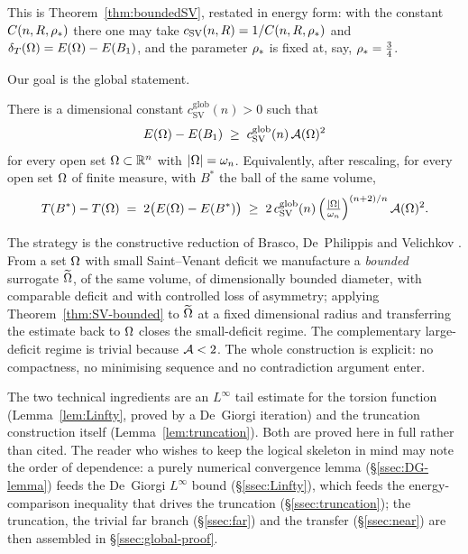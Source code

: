 This is Theorem~\ref{thm:boundedSV}, restated in energy form: with the
constant $C(n,R,\rho_*)$ there one may take
$c_{\mathrm{SV}}(n,R)=1/C(n,R,\rho_*)$ and
$\delta_T(\Omega)=E(\Omega)-E(B_1)$, and the parameter $\rho_*$ is fixed at, say,
$\rho_*=\tfrac34$.

Our goal is the global statement.

\begin{theorem}\label{thm:SV-global}
There is a dimensional constant $c_{\mathrm{SV}}^{\mathrm{glob}}(n)>0$
such that
\begin{equation}\label{eq:SV-global}
   E(\Omega)-E(B_1)\;\ge\;c_{\mathrm{SV}}^{\mathrm{glob}}(n)\,\mathcal A(\Omega)^2
\end{equation}
for every open set $\Omega\subset\mathbb R^n$ with $\left|\Omega\right|=\omega_n$.
Equivalently, after rescaling, for every open set $\Omega$ of finite
measure, with $B^*$ the ball of the same volume,
\begin{equation}\label{eq:T-global}
   T(B^*)-T(\Omega)\;=\;2\bigl(E(\Omega)-E(B^*)\bigr)\;\ge\;
   2\,c_{\mathrm{SV}}^{\mathrm{glob}}(n)\,
   \Bigl(\tfrac{\left|\Omega\right|}{\omega_n}\Bigr)^{(n+2)/n}\,\mathcal A(\Omega)^2 .
\end{equation}
\end{theorem}

The strategy is the constructive reduction of Brasco, De~Philippis and
Velichkov \cite[\S5]{BDV}. From a set $\Omega$ with small Saint--Venant
deficit we manufacture a \emph{bounded} surrogate $\widetilde{\Omega}$, of the same
volume, of dimensionally bounded diameter, with comparable deficit and
with controlled loss of asymmetry; applying
Theorem~\ref{thm:SV-bounded} to $\widetilde{\Omega}$ at a fixed dimensional radius
and transferring the estimate back to $\Omega$ closes the small-deficit
regime. The complementary large-deficit regime is trivial because
$\mathcal A<2$. The whole construction is explicit: no compactness, no
minimising sequence and no contradiction argument enter.

The two technical ingredients are an $L^\infty$ tail estimate for the
torsion function (Lemma~\ref{lem:Linfty}, proved by a De~Giorgi
iteration) and the truncation construction itself
(Lemma~\ref{lem:truncation}). Both are proved here in full rather than
cited. The reader who wishes to keep the logical skeleton in mind may
note the order of dependence: a purely numerical convergence lemma
(\S\ref{ssec:DG-lemma}) feeds the De~Giorgi $L^\infty$ bound
(\S\ref{ssec:Linfty}), which feeds the energy-comparison inequality that
drives the truncation (\S\ref{ssec:truncation}); the truncation, the
trivial far branch (\S\ref{ssec:far}) and the transfer
(\S\ref{ssec:near}) are then assembled in \S\ref{ssec:global-proof}.

